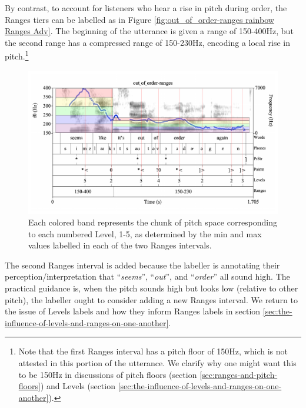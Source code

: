 \documentclass[11pt, twoside]{memoir}
\def\langtext#1{\textit{#1}}
\begin{document}
By contrast, to account for listeners who hear a rise in pitch during order, the Ranges tiers can be labelled as in Figure \ref{fig:out_of_order-ranges rainbow Ranges Adv}. The beginning of the utterance is given a range of 150-400Hz, but the second range has a compressed range of 150-230Hz, encoding a local rise in pitch.\footnote{Note that the first Ranges interval has a pitch floor of 150Hz, which is not attested in this portion of the utterance. We clarify why one might want this to be 150Hz in discussions of pitch floors (section \ref{sec:ranges-and-pitch-floors}) and Levels (section \ref{sec:the-influence-of-levels-and-ranges-on-one-another}).}

\begin{figure}[H]
\centering
%
\includegraphics[width=.875\linewidth]{out_of_order-ranges-2RangeIntervals-noparens-rainbow.pdf}
%
\caption[Each colored band represents the chunk of pitch space corresponding to each numbered Level, 1-5.]{Each colored band represents the chunk of pitch space corresponding to each numbered Level, 1-5, as determined by the min and max values labelled in each of the two Ranges intervals.%
\label{fig:out_of_order-ranges 2range no() Ranges Adv}%
}
\end{figure}

The second Ranges interval is added because the labeller is annotating their perception\slash interpretation that “\langtext{seems}”, “\langtext{out}”, and “\langtext{order}” all sound high.  The practical guidance is, when the pitch sounds high but looks low (relative to other pitch), the labeller ought to consider adding a new Ranges interval. We return to the issue of Levels labels and how they inform Ranges labels in section \ref{sec:the-influence-of-levels-and-ranges-on-one-another}.
\end{document}
